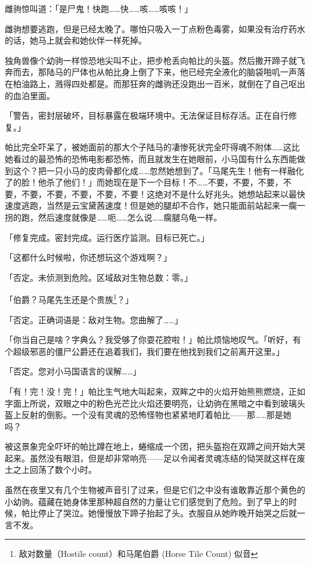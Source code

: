 雌驹惊叫道：「是尸鬼！快跑……快……咳……咳咳！」

雌驹想要逃跑，但是已经太晚了。哪怕只吸入一丁点粉色毒雾，如果没有治疗药水的话，她马上就会和她伙伴一样死掉。

独角兽像个幼驹一样惊恐地尖叫不止，把步枪丢向帕比的头盔。然后撒开蹄子就飞奔而去，那陆马的尸体也从帕比身上倒了下来，他已经完全液化的脑袋啪叽一声落在柏油路上，溅得四处都是。而那狂奔的雌驹还没跑出一百米，就倒在了自己呕出的血泊里面。

「{\mt 警告，密封层破坏，目标暴露在极端环境中。无法保证目标存活。正在自行修复。}」

帕比完全吓呆了，被她面前的那大个子陆马的凄惨死状完全吓得魂不附体……这比她看过的最恐怖的恐怖电影都恐怖，而且就发生在她眼前，小马国有什么东西能做到这个？把一只小马的皮肉骨都化成……忽然她想到了。「马尾先生！他有一样融化了的脸！他杀了他们！」而她现在是下一个目标！不……不要，不要，不要，不要，不要，不要，不要，不要，不要！这绝对不是什么好兆头。她想站起来以最快速度逃跑，当然是云宝黛茜速度！但是她的腿却不合作，她只能面前站起来一瘸一拐的跑，然后速度就像是……呃……怎么说……瘸腿乌龟一样。

「{\mt 修复完成。密封完成。运行医疗监测。目标已死亡。}」

「这都什么时候啦，你还想玩这个游戏啊？」

「{\mt 否定。未侦测到危险。区域敌对生物总数：零。}」

「伯爵？马尾先生还是个贵族\footnote{敌对数量（Hostile
  count）和马尾伯爵 (Horse Tile Count) 似音}？」

「{\mt 否定。正确词语是：敌对生物。您曲解了……}」

「你当自己是啥？字典么？我受够了你耍花腔啦！」帕比烦恼地叹气。「听好，有个超级邪恶的僵尸公爵还在追着我们，我们要在他找到我们之前离开这里。」

「{\mt 否定。您对小马国语言的误解……}」

「有！完！没！完！」帕比生气地大叫起来，双眸之中的火焰开始熊熊燃烧，正如字面上所说，双眼之中的粉色光芒比火焰还要明亮，让幼驹在黑暗之中看到玻璃头盔上反射的倒影。一个没有灵魂的恐怖怪物也紧紧地盯着帕比——那……那是她吗？

被这景象完全吓坏的帕比蹲在地上，蜷缩成一个团，把头盔抱在双蹄之间开始大哭起来。虽然没有眼泪，但是却非常响亮——足以令闻者灵魂冻结的恸哭就这样在废土之上回荡了数个小时。

\horizonline


虽然在夜里又有几个生物被声音引了过来，但是它们之中没有谁敢靠近那个黄色的小幼驹。蕴藏在她身体里那种超自然的力量让它们感觉到了危险。到了早上的时候，帕比停止了哭泣。她慢慢放下蹄子抬起了头。衣服自从她昨晚开始哭之后就一言不发。

